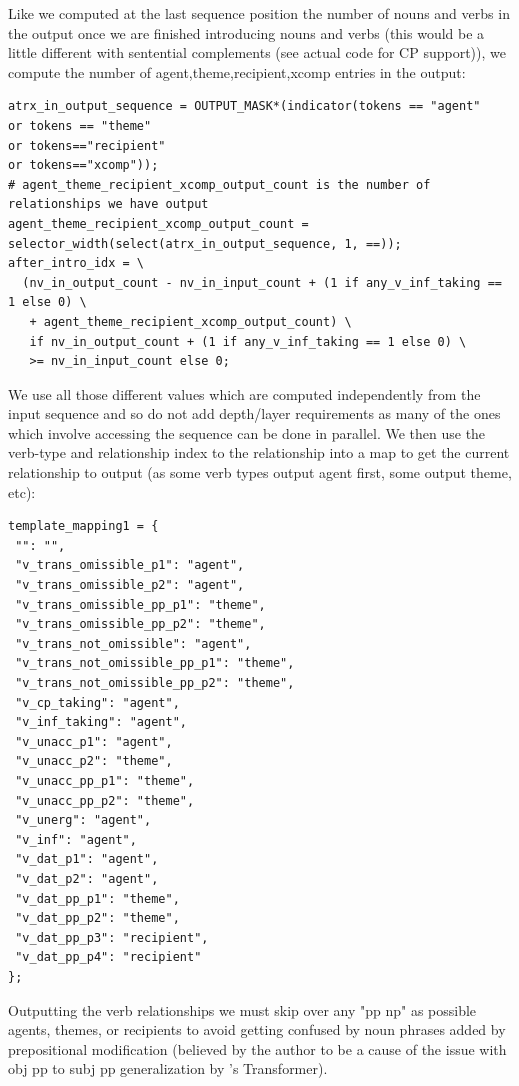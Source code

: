 \documentclass[11pt]{article}
\begin{document}
Like we computed at the last sequence position the number of nouns and verbs in the output once we are finished introducing nouns and verbs (this would be a little different with sentential complements (see actual code for CP support)), we compute the number of agent,theme,recipient,xcomp entries in the output:
\begin{tiny}
\begin{verbatim}
atrx_in_output_sequence = OUTPUT_MASK*(indicator(tokens == "agent"
or tokens == "theme"
or tokens=="recipient"
or tokens=="xcomp"));
# agent_theme_recipient_xcomp_output_count is the number of relationships we have output
agent_theme_recipient_xcomp_output_count = 
selector_width(select(atrx_in_output_sequence, 1, ==));
after_intro_idx = \
  (nv_in_output_count - nv_in_input_count + (1 if any_v_inf_taking == 1 else 0) \
   + agent_theme_recipient_xcomp_output_count) \
   if nv_in_output_count + (1 if any_v_inf_taking == 1 else 0) \
   >= nv_in_input_count else 0;
\end{verbatim}
\end{tiny}
\clearpage
We use all those different values which are computed independently from the input sequence and so do not add depth/layer requirements as many of the ones which involve accessing the sequence can be done in parallel. 
We then use the verb-type and relationship index to the relationship into a map to get the current relationship to output (as some verb types output agent first, some output theme, etc):
\begin{tiny}
\begin{verbatim}
template_mapping1 = {
 "": "",
 "v_trans_omissible_p1": "agent",
 "v_trans_omissible_p2": "agent",
 "v_trans_omissible_pp_p1": "theme",
 "v_trans_omissible_pp_p2": "theme",
 "v_trans_not_omissible": "agent",
 "v_trans_not_omissible_pp_p1": "theme",
 "v_trans_not_omissible_pp_p2": "theme",
 "v_cp_taking": "agent",
 "v_inf_taking": "agent",
 "v_unacc_p1": "agent",
 "v_unacc_p2": "theme",
 "v_unacc_pp_p1": "theme",
 "v_unacc_pp_p2": "theme",
 "v_unerg": "agent",
 "v_inf": "agent",
 "v_dat_p1": "agent",
 "v_dat_p2": "agent",
 "v_dat_pp_p1": "theme",
 "v_dat_pp_p2": "theme",
 "v_dat_pp_p3": "recipient",
 "v_dat_pp_p4": "recipient"
};
\end{verbatim}
\end{tiny}

Outputting the verb relationships we must skip over any "pp np" as possible agents, themes, or recipients to avoid getting confused by noun phrases added by prepositional modification (believed by the author to be a cause of the issue with obj pp to subj pp generalization by \citep{Wu2023}'s Transformer).
\end{document}
